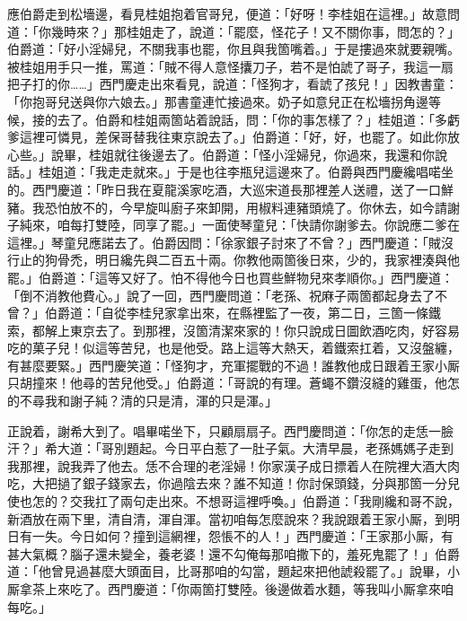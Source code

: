 應伯爵走到松墻邊，看見桂姐抱着官哥兒，便道：「好呀！李桂姐在這裡。」故意問道：「你幾時來？」{}那桂姐走了，說道：「罷麼，怪花子！又不關你事，問怎的？」伯爵道：「好小淫婦兒，不關我事也罷，你且與我箇嘴着。」于是摟過來就要親嘴。被桂姐用手只一推，罵道：「賊不得人意怪攮刀子，若不是怕諕了哥子，我這一扇把子打的你……」西門慶走出來看見，說道：「怪狗才，看諕了孩兒！」因教書童：「你抱哥兒送與你六娘去。」那書童連忙接過來。奶子如意兒正在松墻拐角邊等候，接的去了。伯爵和桂姐兩箇站着說話，問：「你的事怎樣了？」桂姐道：「多虧爹這裡可憐見，差保哥替我往東京說去了。」伯爵道：「好，好，也罷了。如此你放心些。」說畢，桂姐就往後邊去了。伯爵道：「怪小淫婦兒，你過來，我還和你說話。」桂姐道：「我走走就來。」于是也往李瓶兒這邊來了。伯爵與西門慶纔唱喏坐的。西門慶道：「昨日我在夏龍溪家吃酒，大巡宋道長那裡差人送禮，送了一口鮮豬。{}我恐怕放不的，今早旋叫廚子來卸開，用椒料連豬頭燒了。你休去，如今請謝子純來，咱每打雙陸，同享了罷。」一面使琴童兒：「快請你謝爹去。你說應二爹在這裡。」琴童兒應諾去了。伯爵因問：「徐家銀子討來了不曾？」西門慶道：「賊沒行止的狗骨禿，明日纔先與二百五十兩。你教他兩箇後日來，少的，我家裡湊與他罷。」伯爵道：「這等又好了。怕不得他今日也買些鮮物兒來孝順你。」西門慶道：「倒不消教他費心。」說了一回，西門慶問道：「老孫、祝麻子兩箇都起身去了不曾？」伯爵道：「自從李桂兒家拿出來，在縣裡監了一夜，第二日，三箇一條鐵索，都解上東京去了。到那裡，沒箇清潔來家的！你只說成日圖飲酒吃肉，好容易吃的菓子兒！似這等苦兒，也是他受。路上這等大熱天，着鐵索扛着，又沒盤纏，有甚麼要緊。」{}西門慶笑道：「怪狗才，充軍擺戰的不過！誰教他成日跟着王家小厮只胡撞來！他尋的苦兒他受。」伯爵道：「哥說的有理。蒼蠅不鑽沒縫的雞蛋，他怎的不尋我和謝子純？清的只是清，渾的只是渾。」

正說着，謝希大到了。唱畢喏坐下，只顧扇扇子。西門慶問道：「你怎的走恁一臉汗？」希大道：「哥別題起。今日平白惹了一肚子氣。大清早晨，老孫媽媽子走到我那裡，說我弄了他去。恁不合理的老淫婦！你家漢子成日摽着人在院裡大酒大肉吃，大把撾了銀子錢家去，你過陰去來？誰不知道！你討保頭錢，分與那箇一分兒使也怎的？{}交我扛了兩句走出來。不想哥這裡呼喚。」伯爵道：「我剛纔和哥不說，新酒放在兩下里，清自清，渾自渾。當初咱每怎麼說來？我說跟着王家小厮，到明日有一失。今日如何？撞到這網裡，怨悵不的人！」西門慶道：「王家那小厮，有甚大氣概？腦子還未變全，養老婆！還不勾俺每那咱撒下的，羞死鬼罷了！」伯爵道：「他曾見過甚麼大頭面目，比哥那咱的勾當，題起來把他諕殺罷了。」{}說畢，小厮拿茶上來吃了。西門慶道：「你兩箇打雙陸。後邊做着水麵，等我叫小厮拿來咱每吃。」

